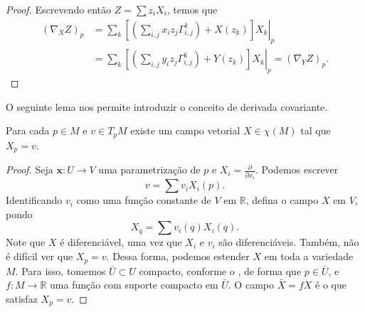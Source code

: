 \begin{lemma}
\begin{proof}
		Escrevendo então $Z=\sum z_{i}X_{i}$, temos que
		\begin{align*}
			(\nabla_{X}Z)_{p} & = \left.\sum_{k}\left[\left( \sum_{i,j}x_{i}z_{j}\Gamma_{i,j}^{k} \right)+X(z_{k})\right]X_{k}\right|_{p}                     \\
			                  & =\left.\sum_{k}\left[\left( \sum_{i,j}y_{i}z_{j}\Gamma_{i,j}^{k} \right)+Y(z_{k})\right]X_{k}\right|_{p} = (\nabla_{Y}Z)_{p}.
		\end{align*}
	\end{proof}
\end{lemma}
O seguinte lema nos permite introduzir o conceito de derivada covariante.
\begin{lemma}
	\label{lem:vetor-estendido-a-campo}
	Para cada $p \in M$ e $v \in T_{p}M$ existe um campo vetorial $X \in \chi (M)$ tal que $X_{p}=v$.
	\begin{proof}

		Seja $\mathbf{x}:U\to V$ uma parametrização de $p$ e $X_{i}=\frac{\partial}{\partial x_{i}}$. Podemos escrever
		\begin{equation*}
			v=\sum v_{i}X_{i}(p).
		\end{equation*}
		Identificando $v_{i}$ como uma função constante de $V$ em $\mathbb{R}$, defina o campo $X$ em $V$, pondo
		\begin{equation*}
			X_{q}=\sum v_{i}(q)X_{i}(q).
		\end{equation*}
		Note que $X$ é diferenciável, uma vez que $X_{i}$ e $v_{i}$ são diferenciáveis. Também, não é difícil ver que $X_{p}=v$.
		Dessa forma, podemos estender $X$ em toda a variedade $M$. Para isso, tomemos $\bar{U}\subset U$ compacto, conforme o , de forma que $p \in \bar{U}$, e $f:M\to \mathbb{R}$ uma função com suporte compacto em $\bar{U}$. O campo $\bar{X}={f}X$ é o que satisfaz $X_{p}=v$.
	\end{proof}
\end{lemma}


